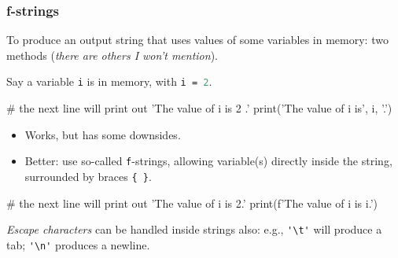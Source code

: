 \documentclass{beamer}
\newenvironment{codeblock}
    {\hfill\begin{beamerboxesrounded}[lower=codecol, width=0.8\textwidth]
    \medskip

    }
    { 
    \end{beamerboxesrounded}\hfill
    }
\theoremstyle{example}
\newcommand{\ct}[1]{\lstinline[language=Python]!#1!}
\newcommand{\ttt}[1]{{\small\texttt{#1}}}
\begin{document}
\begin{frame}[fragile]
\frametitle{{\ttm f}-strings}

To produce an output string that uses values of some variables in memory: two methods (\emph{there are others I won't mention}).

\pause
Say a variable \ttt{i} is in memory, with \ttt{i = }\ct{2}.

\pause
\begin{codeblock}

\begin{python}
# the next line will print out 'The value of i is 2 .'
print('The value of i is', i, '.')
\end{python}

\end{codeblock}

\begin{itemize}
	\item Works, but has some downsides. 
	\pause
	\item Better: use so-called \ttt{f}-strings, allowing variable(s) directly inside the string, surrounded by braces \ttt{\{ \}}.
\end{itemize}

\begin{codeblock}

\begin{python}
# the next line will print out 'The value of i is 2.'
print(f'The value of i is {i}.')
\end{python}

\end{codeblock}

\pause
\emph{Escape characters} can be handled inside strings also: e.g., \verb|'\t'| will produce a tab; \verb|'\n'| produces a newline.

\end{frame}
\end{document}
